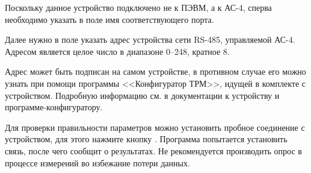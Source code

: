 Поскольку данное устройство подключено не к ПЭВМ, а к АС-4, сперва необходимо указать в поле  имя соответствующего порта.

Далее нужно в поле  указать адрес устройства сети RS-485, управляемой АС-4. Адресом является целое число в диапазоне 0--248, кратное 8.

Адрес может быть подписан на самом устройстве, в противном случае его можно узнать при помощи программы <<Конфигуратор ТРМ>>, идущей в комплекте с устройством. Подробную информацию см. в документации к устройству и программе-конфигуратору.

\bigskip

Для проверки правильности параметров можно установить пробное соединение с устройством, для этого нажмите кнопку . Программа попытается установить связь, после чего сообщит о результатах. Не рекомендуется производить опрос в процессе измерений во избежание потери данных.